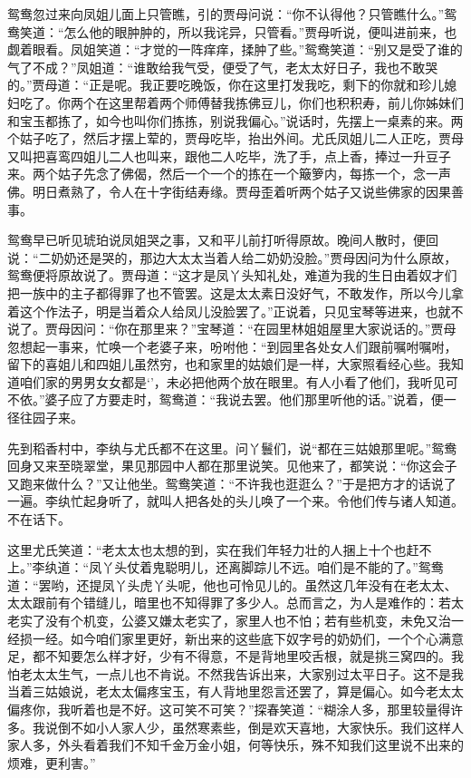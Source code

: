 鸳鸯忽过来向凤姐儿面上只管瞧，引的贾母问说：``你不认得他？只管瞧什么。''鸳鸯笑道：``怎么他的眼肿肿的，所以我诧异，只管看。''贾母听说，便叫进前来，也觑着眼看。凤姐笑道：``才觉的一阵痒痒，揉肿了些。''鸳鸯笑道：``别又是受了谁的气了不成？''凤姐道：``谁敢给我气受，便受了气，老太太好日子，我也不敢哭的。''贾母道：``正是呢。我正要吃晚饭，你在这里打发我吃，剩下的你就和珍儿媳妇吃了。你两个在这里帮着两个师傅替我拣佛豆儿，你们也积积寿，前儿你姊妹们和宝玉都拣了，如今也叫你们拣拣，别说我偏心。''说话时，先摆上一桌素的来。两个姑子吃了，然后才摆上荤的，贾母吃毕，抬出外间。尤氏凤姐儿二人正吃，贾母又叫把喜鸾四姐儿二人也叫来，跟他二人吃毕，洗了手，点上香，捧过一升豆子来。两个姑子先念了佛偈，然后一个一个的拣在一个簸箩内，每拣一个，念一声佛。明日煮熟了，令人在十字街结寿缘。贾母歪着听两个姑子又说些佛家的因果善事。

鸳鸯早已听见琥珀说凤姐哭之事，又和平儿前打听得原故。晚间人散时，便回说：``二奶奶还是哭的，那边大太太当着人给二奶奶没脸。''贾母因问为什么原故，鸳鸯便将原故说了。贾母道：``这才是凤丫头知礼处，难道为我的生日由着奴才们把一族中的主子都得罪了也不管罢。这是太太素日没好气，不敢发作，所以今儿拿着这个作法子，明是当着众人给凤儿没脸罢了。''正说着，只见宝琴等进来，也就不说了。贾母因问：``你在那里来？''宝琴道：``在园里林姐姐屋里大家说话的。''贾母忽想起一事来，忙唤一个老婆子来，吩咐他：``到园里各处女人们跟前嘱咐嘱咐，留下的喜姐儿和四姐儿虽然穷，也和家里的姑娘们是一样，大家照看经心些。我知道咱们家的男男女女都是`'，未必把他两个放在眼里。有人小看了他们，我听见可不依。''婆子应了方要走时，鸳鸯道：``我说去罢。他们那里听他的话。''说着，便一径往园子来。

先到稻香村中，李纨与尤氏都不在这里。问丫鬟们，说``都在三姑娘那里呢。''鸳鸯回身又来至晓翠堂，果见那园中人都在那里说笑。见他来了，都笑说：``你这会子又跑来做什么？''又让他坐。鸳鸯笑道：``不许我也逛逛么？''于是把方才的话说了一遍。李纨忙起身听了，就叫人把各处的头儿唤了一个来。令他们传与诸人知道。不在话下。

这里尤氏笑道：``老太太也太想的到，实在我们年轻力壮的人捆上十个也赶不上。''李纨道：``凤丫头仗着鬼聪明儿，还离脚踪儿不远。咱们是不能的了。''鸳鸯道：``罢哟，还提凤丫头虎丫头呢，他也可怜见儿的。虽然这几年没有在老太太、太太跟前有个错缝儿，暗里也不知得罪了多少人。总而言之，为人是难作的：若太老实了没有个机变，公婆又嫌太老实了，家里人也不怕；若有些机变，未免又治一经损一经。如今咱们家里更好，新出来的这些底下奴字号的奶奶们，一个个心满意足，都不知要怎么样才好，少有不得意，不是背地里咬舌根，就是挑三窝四的。我怕老太太生气，一点儿也不肯说。不然我告诉出来，大家别过太平日子。这不是我当着三姑娘说，老太太偏疼宝玉，有人背地里怨言还罢了，算是偏心。如今老太太偏疼你，我听着也是不好。这可笑不可笑？''探春笑道：``糊涂人多，那里较量得许多。我说倒不如小人家人少，虽然寒素些，倒是欢天喜地，大家快乐。我们这样人家人多，外头看着我们不知千金万金小姐，何等快乐，殊不知我们这里说不出来的烦难，更利害。''


